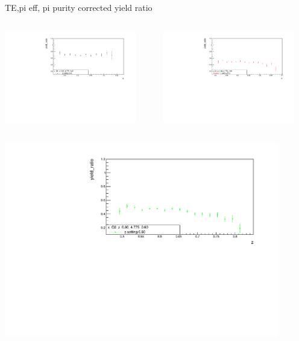 \begin{frame}{TE,pi eff, pi purity corrected yield ratio}
\begin{columns}
\begin{column}[T]{0.5\textwidth}
\includegraphics[width = 0.9\textwidth]{results/yield/statistics_corr/x_Q2_z_0.60_4.775_0.40_ratio.pdf}
\end{column}
\begin{column}[T]{0.5\textwidth}
\includegraphics[width = 0.9\textwidth]{results/yield/statistics_corr/x_Q2_z_0.60_4.775_0.50_ratio.pdf}
\end{column}
\end{columns}
\begin{columns}
\begin{column}[T]{0.5\textwidth}
\includegraphics[width = 0.9\textwidth]{results/yield/statistics_corr/x_Q2_z_0.60_4.775_0.60_ratio.pdf}

\end{column}
\end{columns}
\end{frame}
